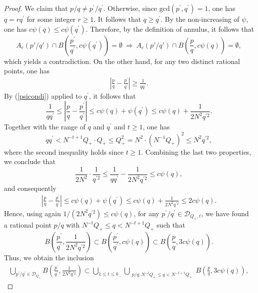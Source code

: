 \documentclass[11pt]{amsart}
\numberwithin{equation}{section}
\newcommand{\0}{\mathbf{0}}
\theoremstyle{remark}
\begin{document}
{\begin{proof}
We claim that ${p}/{q}\neq{p^{\prime}}/{q^{\prime}}.$ Otherwise, since $\textrm{gcd}(p^{\prime},q^{\prime})=1$, one has $q=rq^{\prime}$ for some integer $r\ge 1$. It follows that $q\ge q^{\prime}$. By the non-increasing of $\psi$, one has $c\psi(q)\le c\psi(q^{\prime})$. Therefore, by the definition of annulus, it follows that
$$A_{c}(p'/q') \cap B\left(\frac{p^{\prime}}{q^{\prime}}, c\psi(q^{\prime})\right) =\emptyset\ \Longrightarrow\  A_{c}(p'/q') \cap B\left(\frac{p}{q}, c\psi(q)\right) =\emptyset,$$
which yields a contradiction. On the other hand, for any two distinct rational points, one has
\begin{align*}
\left|\frac{p}{q}-\frac{p^{\prime}}{q^{\prime}}\right|\ge\frac{1}{qq^{\prime}}.
\end{align*}
By (\ref{psicondi}) applied to $q^{\prime}$, it follows that
$$\frac{1}{qq^{\prime}}\le  \left|\frac{p}{q}-\frac{p^{\prime}}{q^{\prime}}\right|\le  c\psi(q)+\psi(q^{\prime})\le c\psi(q)+\frac{1}{2N^2q^{\prime2}}.$$
Together with the range of $q$ and $q^{\prime}$ and $t\ge 1$, one has $$qq^{\prime}< N^{-t+1}Q_+\cdot Q_+\le Q_{+}^2
= N^2\cdot (N^{-1}Q_+)^2\le N^2q^{\prime2}, $$
where the second inequality holds since $t\ge 1$.
    Combining the last two properties, we conclude that
    $$\frac{1}{2N^2}\cdot\frac{1}{q^{\prime2}}\le
    \frac{1}{qq^{\prime}}-\frac{1}{2N^2q^{\prime2}}
    \le c\psi(q),$$
    and consequently
    \begin{align*}
    \left|\frac{p}{q}-\frac{p^{\prime}}{q^{\prime}}\right|
    \le c\psi(q)+\psi(q^{\prime})
    \le 
    c\psi(q)+\frac{1}{2N^2q^{\prime2}}
    \le 2c\psi(q).
    \end{align*}
    Hence, using again $1/(2N^2q^{\prime2})\le c\psi(q)$, for any $p^{\prime}/q^{\prime}\in\mathcal{D}_{Q_+,t}$, we have found a rational point $p/q$ with $N^{-t} Q_+\le q<N^{-t+1}Q_+$ such that
    $$B\left(\frac{p^{\prime}}{q^{\prime}},\frac{1}{2N^2q^{\prime2}}\right)\subset
    B\left(\frac{p^{\prime}}{q^{\prime}},c\psi(q)\right)
    \subset B\left(\frac{p}{q},3c\psi(q)\right).$$
    Thus, we obtain the inclusion
    \begin{align}\label{result1}
       \bigcup_{p^{\prime}/q^{\prime}\in\mathcal{D}_{Q_+}}B\left(\frac{p^{\prime}}{q^{\prime}},\frac{1}{2N^2q^{\prime2}}\right)\subset \bigcup_{1\le t\le k_-}\bigcup_{\substack{p/q:N^{-t} Q_+\le q<N^{-t+1}Q_+}}B\left(\frac{p}{q},3c\psi(q)\right),
    \end{align}

\end{proof}}
\end{document}

